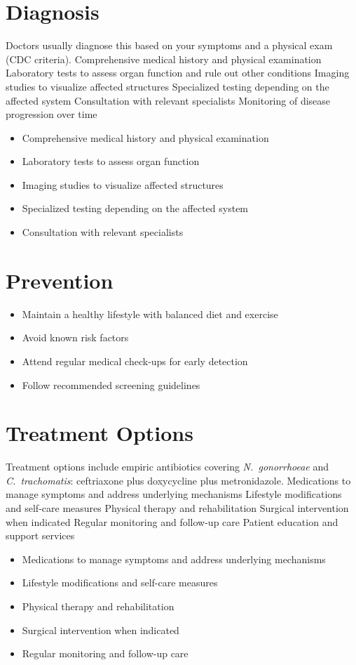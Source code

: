 \section{Diagnosis}
Doctors usually diagnose this based on your symptoms and a physical exam (CDC criteria). Comprehensive medical history and physical examination Laboratory tests to assess organ function and rule out other conditions Imaging studies to visualize affected structures Specialized testing depending on the affected system Consultation with relevant specialists Monitoring of disease progression over time

\begin{itemize}[noitemsep]
  \item Comprehensive medical history and physical examination
  \item Laboratory tests to assess organ function
  \item Imaging studies to visualize affected structures
  \item Specialized testing depending on the affected system
  \item Consultation with relevant specialists
\end{itemize}
\section{Prevention}
\begin{itemize}[noitemsep]
  \item Maintain a healthy lifestyle with balanced diet and exercise
  \item Avoid known risk factors
  \item Attend regular medical check-ups for early detection
  \item Follow recommended screening guidelines
\end{itemize}
\section{Treatment Options}
Treatment options include empiric antibiotics covering \textit{N.~gonorrhoeae} and \textit{C.~trachomatis}: ceftriaxone plus doxycycline plus metronidazole. Medications to manage symptoms and address underlying mechanisms Lifestyle modifications and self-care measures Physical therapy and rehabilitation Surgical intervention when indicated Regular monitoring and follow-up care Patient education and support services

\begin{itemize}[noitemsep]
  \item Medications to manage symptoms and address underlying mechanisms
  \item Lifestyle modifications and self-care measures
  \item Physical therapy and rehabilitation
  \item Surgical intervention when indicated
  \item Regular monitoring and follow-up care
\end{itemize}
